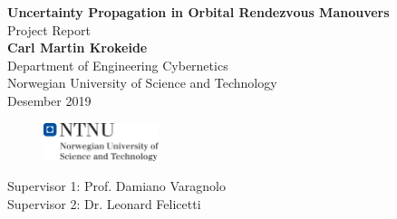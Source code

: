 \documentclass[a4paper]{article}
\begin{document}
\begin{titlepage}
\begin{center}
\Large \textbf{Uncertainty Propagation in Orbital Rendezvous Manouvers} \\
\vspace{0.25cm}
\large Project Report \\
\vspace{0.5cm}
\large \textbf{Carl Martin Krokeide} \\
\vspace{0.1cm}
 Department of Engineering Cybernetics \\
\vspace{0.1cm}
 Norwegian University of Science and Technology \\
\vspace{0.5cm}
\large Desember 2019 \\
\vspace{1cm}
\end{center}
\end{titlepage}





\begin{figure}
    \centering
    \includegraphics[width=0.3\textwidth]{hovedlogo_eng.png}
\end{figure}

\vspace{\fill}
\large{Supervisor 1: Prof. Damiano Varagnolo \\
Supervisor 2: Dr. Leonard Felicetti} 

\begin{figure}
\end{figure}


\newpage

\tableofcontents 

\newpage



\newpage



\newpage



\newpage

\printbibliography[heading=bibintoc,title={References}]
\end{document}
